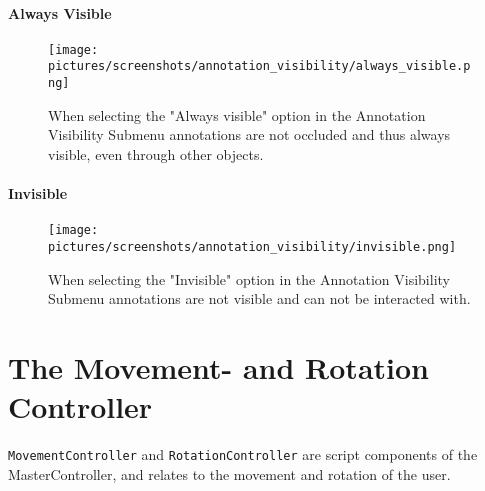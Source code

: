 \paragraph{Always Visible}
\begin{figure}%
	\texttt{[image: pictures/screenshots/annotation\_visibility/always\_visible.png]}
	\caption[Annotation always visible]{When selecting the "Always visible" option in the Annotation Visibility Submenu annotations are not occluded and thus always visible, 
	even through other objects.}
	\label{fig:always_visible}
\end{figure} 

\paragraph{Invisible}
\begin{figure}%
	\texttt{[image: pictures/screenshots/annotation\_visibility/invisible.png]}
	\caption[Annotation invisible]{When selecting the "Invisible" option in the Annotation Visibility Submenu annotations are not visible and can not be interacted with.}
	\label{fig:invisible}
\end{figure} 

\section{The Movement- and Rotation Controller}
\texttt{MovementController} and \texttt{RotationController} are script components of the MasterController, and relates to the movement and rotation of the user.












